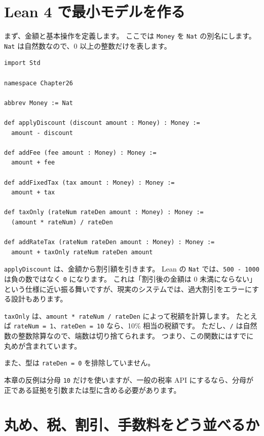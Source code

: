 \section{Lean 4 で最小モデルを作る}

まず、金額と基本操作を定義します。
ここでは \texttt{Money} を \texttt{Nat} の別名にします。
\texttt{Nat} は自然数なので、0 以上の整数だけを表します。

\begin{listing}[htbp]
\begin{verbatim}
import Std

namespace Chapter26

abbrev Money := Nat

def applyDiscount (discount amount : Money) : Money :=
  amount - discount

def addFee (fee amount : Money) : Money :=
  amount + fee

def addFixedTax (tax amount : Money) : Money :=
  amount + tax

def taxOnly (rateNum rateDen amount : Money) : Money :=
  (amount * rateNum) / rateDen

def addRateTax (rateNum rateDen amount : Money) : Money :=
  amount + taxOnly rateNum rateDen amount
\end{verbatim}
\caption{\texttt{Money} の基本操作}
\label{lst:ch26-money-model}
\end{listing}

\texttt{applyDiscount} は、金額から割引額を引きます。
Lean の \texttt{Nat} では、\texttt{500 - 1000} は負の数ではなく \texttt{0} になります。
これは「割引後の金額は 0 未満にならない」という仕様に近い振る舞いですが、現実のシステムでは、過大割引をエラーにする設計もあります。

\texttt{taxOnly} は、\texttt{amount * rateNum / rateDen} によって税額を計算します。
たとえば \texttt{rateNum = 1}、\texttt{rateDen = 10} なら、10\% 相当の税額です。
ただし、\texttt{/} は自然数の整数除算なので、端数は切り捨てられます。
つまり、この関数にはすでに丸めが含まれています。

また、型は \texttt{rateDen = 0} を排除していません。

本章の反例は分母 \texttt{10} だけを使いますが、一般の税率 API にするなら、分母が正である証拠を引数または型に含める必要があります。

\section{丸め、税、割引、手数料をどう並べるか}

